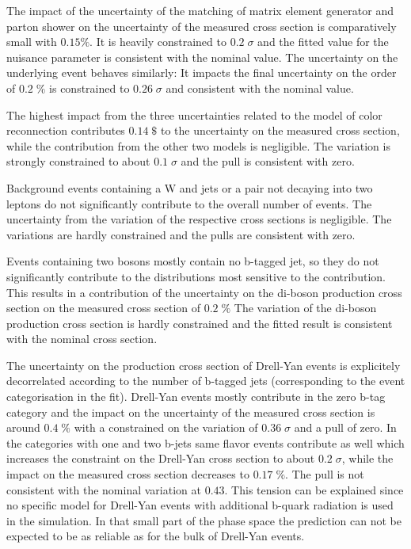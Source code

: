 The impact of the uncertainty of the matching of matrix element generator and parton shower on the uncertainty of the measured cross section is comparatively small with $0.15 \%$. 
It is heavily constrained to $0.2 \; \sigma$ and the fitted value for the nuisance parameter is consistent with the nominal value.
The uncertainty on the underlying event behaves similarly: It impacts the final uncertainty on the order of $0.2 \; \%$ is constrained to $0.26 \; \sigma$ and consistent with the nominal value.

The highest impact from the three uncertainties related to the model of color reconnection contributes $0.14 \; \$$ to the uncertainty on the measured cross section, while the contribution from the other two models is negligible.
The variation is strongly constrained to about $0.1 \; \sigma$ and the pull is consistent with zero.

Background events containing a W and jets or a \ttbar pair not decaying into two leptons do not significantly contribute to the overall number of events.
The uncertainty from the variation of the respective cross sections is negligible. The variations are hardly constrained and the pulls are consistent with zero.

Events containing two bosons mostly contain no b-tagged jet, so they do not significantly contribute to the distributions most sensitive to the \ttbar contribution. This results in a contribution of the uncertainty on the di-boson production cross section on the measured \ttbar cross section of $0.2 \; \%$
The variation of the di-boson production cross section is hardly constrained and the fitted result is consistent with the nominal cross section.

The uncertainty on the production cross section of Drell-Yan events is explicitely decorrelated according to the number of b-tagged jets (corresponding to the event categorisation in the fit).
Drell-Yan events mostly contribute in the zero b-tag category and the impact on the uncertainty of the measured \ttbar cross section is around $0.4 \; \%$ with a constrained on the variation of $0.36 \; \sigma$ and a pull of zero.
In the categories with one and two b-jets same flavor events contribute as well which increases the constraint on the Drell-Yan cross section to about $0.2 \; \sigma$, while the impact on the measured \ttbar cross section decreases to $0.17 \; \%$.
The pull is not consistent with the nominal variation at $0.43$. This tension can be explained since no specific model for Drell-Yan events with additional b-quark radiation is used in the simulation. In that small part of the 
phase space the prediction can not be expected to be as reliable as for the bulk of Drell-Yan events.      

